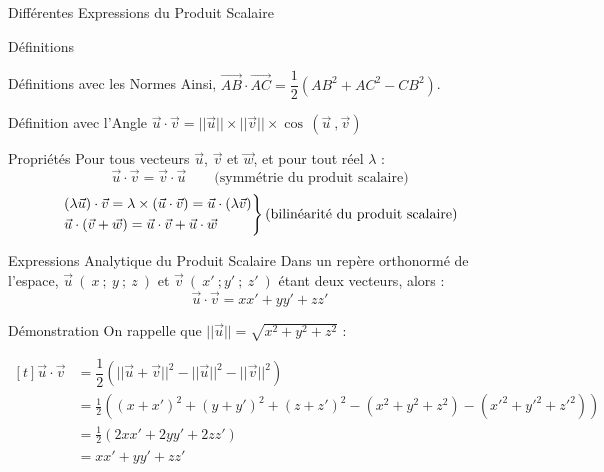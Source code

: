\documentclass{cours}
\begin{document}
\begin{Gpartie}{Différentes Expressions du Produit Scalaire}
\begin{Spartie}{Définitions}
\begin{SSpartie}{Définitions avec les Normes}
                Ainsi, $\overrightarrow{AB}\cdot\overrightarrow{AC}=\dfrac{1}{2}\left(AB^2+AC^2-CB^2\right)$.
            \end{SSpartie}
            \begin{SSpartie}{Définition avec l'Angle} 
                $\vec{u}\cdot\vec{v}=\lvert\lvert\vec{u}\rvert\rvert\times\lvert\lvert\vec{v}\rvert\rvert\times\cos\,\left(\vec{u}~,\vec{v}\right)$
            \end{SSpartie}
        \end{Spartie}
        \begin{Spartie}{Propriétés} 
            Pour tous vecteurs $\vec{u}$, $\vec{v}$ et $\vec{w}$, et pour tout réel $\lambda$ : \[\vec{u}\cdot\vec{v}=\vec{v}\cdot\vec{u}\qquad\text{(symmétrie du produit scalaire)}\] \[\begin{drcases}\left(\lambda\vec{u}\right)\cdot\vec{v}=\lambda\times\left(\vec{u}\cdot\vec{v}\right)=\vec{u}\cdot\left(\lambda\vec{v}\right) \\ \vec{u}\cdot\left(\vec{v}+\vec{w}\right)=\vec{u}\cdot\vec{v}+\vec{u}\cdot\vec{w}\end{drcases}\text{(bilinéarité du produit scalaire)}\]
        \end{Spartie}
        \begin{Spartie}{Expressions Analytique du Produit Scalaire} 
            Dans un repère orthonormé de l'espace, $\vec{u}~\left(~x~;~y~;~z~\right)$ et $\vec{v}~\left(~x'~;y'~;~z'~\right)$ étant deux vecteurs, alors : \[\vec{u}\cdot\vec{v}=xx'+yy'+zz'\] 
            \begin{SSpartie}{Démonstration} 
                On rappelle que $\lvert\lvert\vec{u}\rvert\rvert=\sqrt{x^2+y^2+z^2}$ :

                $\begin{aligned}[t]
                    \vec{u}\cdot\vec{v}&=\dfrac{1}{2}\left(\lvert\lvert\vec{u}+\vec{v}\rvert\rvert^2-\lvert\lvert\vec{u}\rvert\rvert^2-\lvert\lvert\vec{v}\rvert\rvert^2\right) \\
                    &=\frac{1}{2}\left(\left(x+x'\right)^2+\left(y+y'\right)^2+\left(z+z'\right)^2-\left(x^2+y^2+z^2\right)-\left(x'^2+y'^2+z'^2\right)\right) \\
                    &=\frac{1}{2}\left(2xx'+2yy'+2zz'\right) \\
                    &=xx'+y y'+z z'
                \end{aligned}$
            \end{SSpartie}
        \end{Spartie}
    \end{Gpartie}
\end{document}
